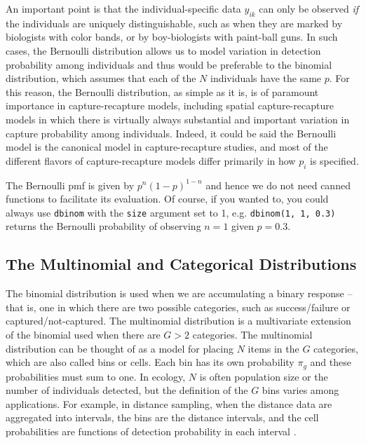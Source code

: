 An important point is that the individual-specific data $y_{ik}$ can only be
observed  {\it if} the individuals are uniquely distinguishable, such as when they
are marked by biologists with color bands, or by boy-biologists with
paint-ball guns.
In such cases, the Bernoulli distribution allows us to
model variation in detection probability among individuals and thus
would be preferable to the binomial distribution, which assumes that each
of the $N$ individuals have the same $p$.
For this reason, the Bernoulli
distribution, as simple as it is, is of paramount importance in
capture-recapture models, including spatial capture-recapture models
in which there is virtually always substantial and important variation in capture probability
among individuals. Indeed, it could be said the Bernoulli model is the
canonical model in capture-recapture studies, and most of the
different flavors of capture-recapture models differ primarily in how $p_i$ is
specified. %

The Bernoulli pmf is given by  $p^n(1-p)^{1-n}$ and hence we do not need canned
functions to facilitate its evaluation. Of course, if you wanted to, you
could always use \verb+dbinom+ with the \verb+size+ argument set to
1, e.g. \verb+dbinom(1, 1, 0.3)+ returns the Bernoulli probability of
observing $n=1$ given $p=0.3$.

\subsection{The Multinomial and Categorical Distributions}
\label{modeling.sec.multinom}

The binomial distribution is used
when we are accumulating a binary response -- that is, one in which there are two possible categories, such as success/failure or captured/not-captured.
The multinomial distribution is a multivariate extension of
the binomial used when there are $G>2$ categories.
The multinomial distribution can be thought of as a model for placing
$N$ items in the $G$ categories, which are also called bins or cells. Each bin has
its own probability $\pi_g$ and these probabilities must sum to one.
In ecology, $N$ is often population size or the number of individuals
detected, but the definition of the $G$ bins varies among
applications. For example, in distance sampling, when the distance
data are aggregated into intervals,
the bins are the distance intervals, and the cell probabilities are
functions of detection probability in each interval \citep{royle_etal:2004}.

